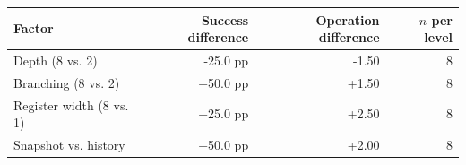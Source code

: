 \begin{tabular}{lrrr}
\toprule
Factor & Success difference & Operation difference & $n$ per level \\
\midrule
Depth (8 vs. 2) & -25.0 pp & -1.50 & 8 \\
Branching (8 vs. 2) & +50.0 pp & +1.50 & 8 \\
Register width (8 vs. 1) & +25.0 pp & +2.50 & 8 \\
Snapshot vs. history & +50.0 pp & +2.00 & 8 \\
\bottomrule
\end{tabular}
